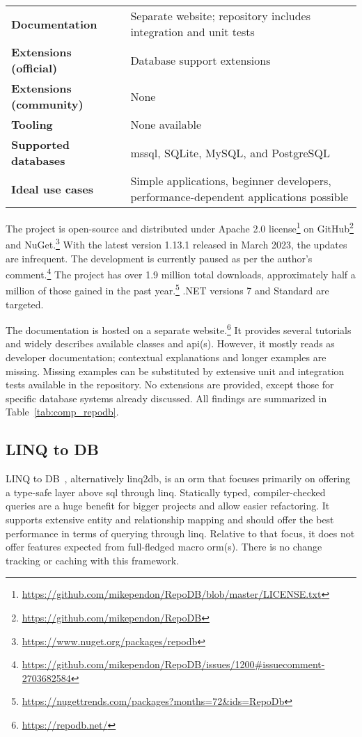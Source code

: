 {\begin{landscape}
\begin{table}[p]
\begin{tabular}{
>{\raggedright\arraybackslash}p{40.00mm}
>{\arraybackslash}p{150.00mm}
}
\textbf{Documentation} & Separate website; repository includes integration and unit tests\\
\textbf{Extensions (official)} & Database support extensions \\
\textbf{Extensions (community)} & None \\
\textbf{Tooling} & None available \\
\textbf{Supported databases} & \acrshort{mssql}, SQLite, MySQL, and PostgreSQL \\
\textbf{Ideal use cases} & Simple applications, beginner developers, performance-dependent applications possible \\
\bottomrule
\end{tabular}
\end{table}
\end{landscape}
}

The project is open-source and distributed under Apache 2.0 license\footnote{\url{https://github.com/mikependon/RepoDB/blob/master/LICENSE.txt}} on GitHub\footnote{\url{https://github.com/mikependon/RepoDB}} and NuGet.\footnote{\url{https://www.nuget.org/packages/repodb}} With the latest version 1.13.1 released in March 2023, the updates are infrequent. The development is currently paused as per the author's comment.\footnote{\url{https://github.com/mikependon/RepoDB/issues/1200\#issuecomment-2703682584}} The project has over 1.9 million total downloads, approximately half a million of those gained in the past year.\footnote{\url{https://nugettrends.com/packages?months=72&ids=RepoDb}} .NET versions 7 and Standard are targeted. 

The documentation is hosted on a separate website.\footnote{\url{https://repodb.net/}} It provides several tutorials and widely describes available classes and \acrshort{api}(s). However, it mostly reads as developer documentation; contextual explanations and longer examples are missing. Missing examples can be substituted by extensive unit and integration tests available in the repository. No extensions are provided, except those for specific database systems already discussed. All findings are summarized in Table~\ref{tab:comp_repodb}.




\subsection{LINQ to DB}
\label{section:linqToDb}

LINQ to DB~\cite{linq2db, linq2dbRepo}, alternatively linq2db, is an \acrshort{orm} that focuses primarily on offering a type-safe layer above \acrshort{sql} through \acrshort{linq}. Statically typed, compiler-checked queries are a huge benefit for bigger projects and allow easier refactoring. It supports extensive entity and relationship mapping and should offer the best performance in terms of querying through \acrshort{linq}. Relative to that focus, it does not offer features expected from full-fledged macro \acrshort{orm}(s). There is no change tracking or caching with this framework.


